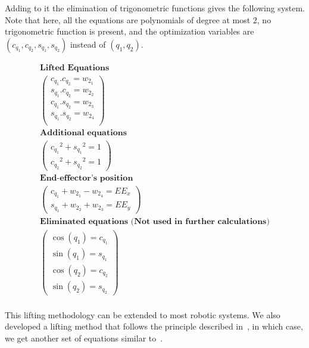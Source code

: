 Adding to it the elimination of trigonometric functions gives the following system.
Note that here, all the equations are polynomials of degree at most 2, no trigonometric function is present, and the optimization variables are $\left(c_{q_1}, c_{q_2}, s_{q_1}, s_{q_2}\right)$ instead of $\left(q_1, q_2\right)$.

\begin{equation}
\begin{array}{c}
  \textbf{Lifted Equations}\\
  \left(\begin{array}{cc}
    c_{q_1}.c_{q_2} = w_{2_1}\\
    s_{q_1}.c_{q_2} = w_{2_2}\\
    c_{q_1}.s_{q_2} = w_{2_3}\\
    s_{q_1}.s_{q_2} = w_{2_4}\\
  \end{array}\right)\\
  \textbf{Additional equations}\\
  \left(\begin{array}{c}
    {c_{q_1}}^2 + {s_{q_1}}^2 = 1\\
    {c_{q_2}}^2 + {s_{q_2}}^2 = 1
  \end{array}\right)\\
  \textbf{End-effector's position}\\
  \left(\begin{array}{c}
    c_{q_1} + w_{2_1} - w_{2_4} = EE_x\\
    s_{q_1} + w_{2_2} + w_{2_3} = EE_y
  \end{array}\right)\\
  \textbf{Eliminated equations (Not used in further calculations)}\\
  \left(\begin{array}{c}
    \cos(q_1)  =  c_{q_1} \\
    \sin(q_1)  =  s_{q_1} \\
    \cos(q_2)  =  c_{q_2} \\
    \sin(q_2)  =  s_{q_2}
  \end{array}\right)\\
\end{array}
\label{eq:lifted_equations_trigo}
\end{equation}

This lifting methodology can be extended to most robotic systems.
We also developed a lifting method that follows the principle described in~, in which case, we get another set of equations similar to~.

